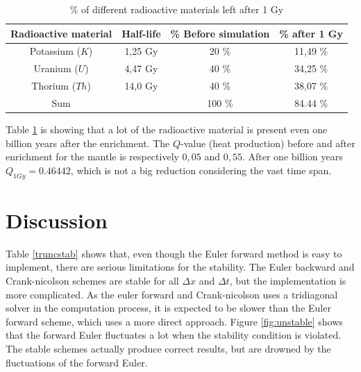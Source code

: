 \documentclass[10pt,a4paper]{article}
\begin{document}
\begin{table} [H]
\centering
\caption{\% of different radioactive materials left after 1 Gy}
\begin{tabular}{|c|c|c|c|}
\hline
Radioactive material & Half-life & \% Before simulation & \% after 1 Gy\\
\hline
Potassium ($K$) 	 & 1,25 Gy   & 20 \% 				 & 11,49 \% \\
\hline
Uranium ($U$)	     & 4,47 Gy   & 40 \%				 & 34,25 \% \\
\hline
Thorium ($Th$)		 & 14,0 Gy	 & 40 \%				 & 38,07 \% \\
\hline
Sum					 & 			 & 100 \% 				 & 84.44 \%\\
\hline
\end{tabular}
\label{Decay}
\end{table}

\noindent Table \ref{Decay} is showing that a lot of the radioactive material is present even one billion years after the enrichment. The $Q$-value (heat production) before and after enrichment for the mantle is respectively $0,05$ and $0,55$. After one billion years $Q_{1Gy}=0.46442$, which is not a big reduction considering the vast time span.   

\newpage
\section*{Discussion}

Table \ref{truncstab} shows that, even though the Euler forward method is easy to implement, there are serious limitations for the stability. The Euler backward and Crank-nicolson schemes are stable for all $\Delta x$ and $\Delta t$, but the implementation is more complicated. As the euler forward and Crank-nicolson uses a tridiagonal solver in the computation process, it is expected to be slower than the Euler forward scheme, which uses a more direct approach. Figure \ref{fig:unstable} shows that the forward Euler fluctuates a lot when the stability condition is violated. The stable schemes actually produce correct results, but are drowned by the fluctuations of the forward Euler. 
\\
\end{document}
